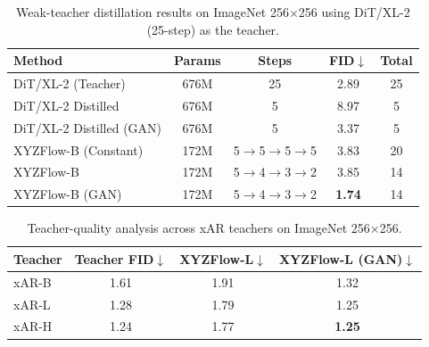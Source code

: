 \documentclass{article}
\theoremstyle{plain}
\theoremstyle{definition}
\theoremstyle{remark}
\begin{document}
\begin{table}[t]
\centering
\scriptsize
\setlength{\tabcolsep}{1.3pt}
\renewcommand{\arraystretch}{1.1}
\caption{Weak-teacher distillation results on ImageNet 256$\times$256 using DiT/XL-2 (25-step) as the teacher.}
\label{tab:weak_teacher}
\begin{tabular}{@{}lcccc@{}}
\toprule
\textbf{Method} & \textbf{Params} & \textbf{Steps} & \textbf{FID$\downarrow$} & \textbf{Total} \\
\midrule
\rowcolor{gray!10}
DiT/XL-2 (Teacher) & 676M & 25 & 2.89 & 25 \\
DiT/XL-2 Distilled & 676M & 5 & 8.97 & 5 \\
DiT/XL-2 Distilled (GAN) & 676M & 5 & 3.37{\color{red}{\tiny$\downarrow$5.60}} & 5 \\
XYZFlow-B (Constant) & 172M & 5$\rightarrow$5$\rightarrow$5$\rightarrow$5 & 3.83{\color{red}{\tiny$\downarrow$5.14}} & 20 \\
XYZFlow-B & 172M & 5$\rightarrow$4$\rightarrow$3$\rightarrow$2 & 3.85{\color{red}{\tiny$\downarrow$5.12}} & 14 \\
\rowcolor{gray!20} XYZFlow-B (GAN) & 172M & 5$\rightarrow$4$\rightarrow$3$\rightarrow$2 & \textbf{1.74{\color{red}{\tiny$\downarrow$1.63}}} & 14 \\
\bottomrule
\end{tabular}
\vspace{-2mm}
\end{table}

\begin{table}[t]
\centering
\scriptsize
\setlength{\tabcolsep}{1.3pt}
\renewcommand{\arraystretch}{1.1}
\caption{Teacher-quality analysis across xAR teachers on ImageNet 256$\times$256.}
\label{tab:teacher_quality}
\begin{tabular}{@{}lccc@{}}
\toprule
\textbf{Teacher} & \textbf{Teacher FID$\downarrow$} & \textbf{XYZFlow-L$\downarrow$} & \textbf{XYZFlow-L (GAN)$\downarrow$} \\
\midrule
\rowcolor{gray!10}
xAR-B & 1.61 & 1.91{\color{blue}{\tiny$\uparrow$0.30}} & 1.32{\color{red}{\tiny$\downarrow$0.59}} \\
xAR-L & 1.28 & 1.79{\color{blue}{\tiny$\uparrow$0.51}} & 1.25{\color{red}{\tiny$\downarrow$0.54}} \\
\rowcolor{gray!20}
xAR-H & 1.24 & 1.77{\color{blue}{\tiny$\uparrow$0.53}} & \textbf{1.25{\color{red}{\tiny$\downarrow$0.52}}} \\
\bottomrule
\end{tabular}
\vspace{-3mm}
\end{table}
\end{document}
